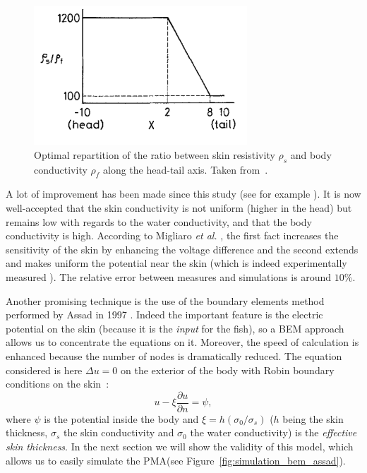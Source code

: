 \begin{figure}
\centering
\includegraphics[width=8cm]{intro/figures/impedance_skin}
\caption{Optimal repartition of the ratio between skin resistivity $\rho_{s}$
and body conductivity $\rho_{f}$ along the head-tail axis. Taken
from~\cite{hoshimiya1980theapteronotus}. \label{fig:skin_resistance_hoshimiya}}
\end{figure}


A lot of improvement has been made since this study (see for example
\cite{babineau2006modeling,maciver2001computational,migliaro2005theoretical,rasnow1989simulation}).
It is now well-accepted that the skin conductivity is not uniform
(higher in the head) but remains low with regards to the water conductivity,
and that the body conductivity is high. According to Migliaro \emph{et al.}
\cite{migliaro2005theoretical}, the first fact increases the sensitivity
of the skin by enhancing the voltage difference and the second extends
and makes uniform the potential near the skin (which is indeed experimentally
measured \cite{nelson-target}). The relative error between measures
and simulations is around $10$\%.

Another promising technique is the use of the boundary elements method
performed by Assad in 1997 \cite{assad1997phd}. Indeed the
important feature is the electric potential on the skin (because it
is the \emph{input} for the fish), so a BEM approach allows us to
concentrate the equations on it. Moreover, the speed of calculation
is enhanced because the number of nodes is dramatically reduced. The
equation considered is here $\Delta u=0$ on the exterior of the body
with Robin boundary conditions on the skin~\cite{williams1990hypercube}:
\begin{equation}
u-\xi\frac{\partial u}{\partial n}=\psi,\label{eq:CL_assad}
\end{equation}
 where $\psi$ is the potential inside the body and $\xi=h\left(\sigma_{0}/\sigma_{s}\right)$
($h$ being the skin thickness, $\sigma_{s}$ the skin conductivity
and $\sigma_{0}$ the water conductivity) is the \emph{effective skin
thickness}. In the next section we will show the validity of this
model, which allows us to easily simulate the PMA(see Figure~\ref{fig:simulation_bem_assad}).

